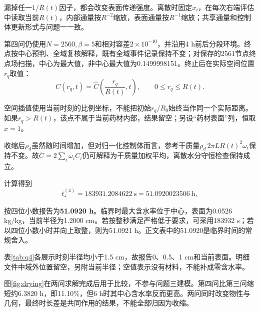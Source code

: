 漏掉任一$1/R(t)$因子，都会改变表面传递强度。离散时固定$x_i$，在每次右端评估中读取当前$R(t)$，内部通量按$R^{-2}$缩放，表面通量按$R^{-1}$缩放；共享通量和控制体更新形式与问题一一致。

第四问仍使用$N=2560,\beta=5$和相对容差$2\times10^{-10}$，并沿用4 h前后分段环境。终点按中心预判、全域复核解释，既有全域事件记录保持不变；对保存的2561节点终点场扫描，中心为最大值，非中心最大值为0.1499998151。终止后在实际空间位置$r_q$取值：
\begin{equation}
C(r_q,t)=\widehat C\!\left(\frac{r_q}{R(t)},t\right),
\qquad 0\le r_q\le R(t).
\end{equation}

空间插值使用当前时刻的比例坐标，不能把初始$r_q/R_0$始终当作同一个实际距离。如果$r_q>R(t)$，该点不属于当前药材内部，结果留空；另设“药材表面”列，恒取$x=1$。

收缩后$\rho_d$虽然随时间增加，但对归一化控制体而言，参考干质量$\rho_d\,2\pi LR(t)^2\omega_i$保持不变。故$\overline C=2\sum_i\omega_i C_i$仍可解释为干质量加权平均，离散水分守恒检查保持成立。



计算得到
\begin{equation}
t_*^{(4)}=183931.2084622\ \mathrm s
=51.0920023506\ \mathrm h ,
\end{equation}

按四位小数报告为\textbf{51.0920 h}。临界时最大含水率位于中心，表面为0.0526 kg/kg，当前半径为1.2000 cm。若按整秒满足严格低于要求，可采用183932 s；若以四位小数小时并向上取整，则为51.0921 h。正文表中的51.0920是临界时间的常规舍入。

表\ref{tab:q4}各展示时刻半径均小于1.5 cm，故报告0、0.5、1 cm和当前表面。明细文件中域外位置留空，另附当前半径；空值表示没有材料，不能补成零含水率。


图\ref{fig:drying}在两问求解完成后用于比较，不参与问题三建模。第四问比第三问缩短约6.3820 h，即11.10\%，但6 h时其中心含水率反而更高。两问同时改变物性与几何，最终时长差是共同作用的结果，不能全部归因为收缩。
